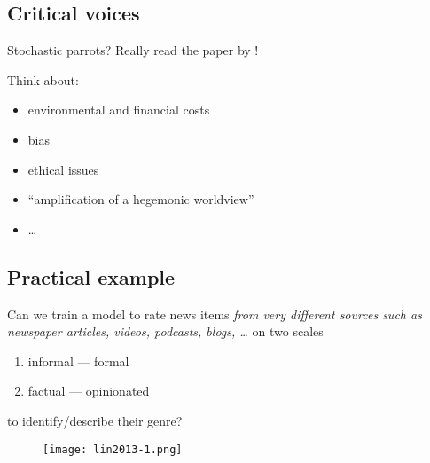 



\subsection{Critical voices}


\begin{frame}{Stochastic parrots?}
Really read the paper by \parencite{Bender2021}!

Think about:

\begin{itemize}
\item environmental and financial costs
\item bias
\item ethical issues
\item ``amplification of a hegemonic worldview''
\item \ldots
\end{itemize}
  
\end{frame}








\subsection{Practical example}


\begin{frame}{\textcite{Lin2023}}

  Can we train a model to rate news items \emph{from very different sources such as newspaper articles, videos, podcasts, blogs, \ldots } on two scales
  \begin{enumerate}
  \item informal --- formal
  \item factual --- opinionated
  \end{enumerate}
to identify/describe their genre?
\end{frame}


\begin{frame}[plain]
\begin{figure}
	\centering
	\texttt{[image: lin2013-1.png]}
\end{figure}
\end{frame}


